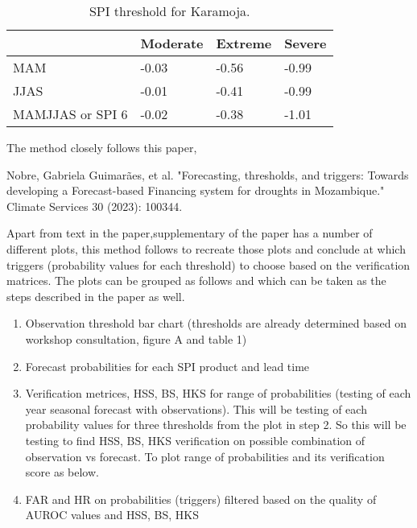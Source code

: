 \begin{table}[!ht]
	\centering
	\caption[SPI threshold for Karamoja ]{SPI threshold for Karamoja.}
	\label{tab:incpacks}
	\begin{tabular}{p{}p{}p{}p{}}
		\toprule
		&\textbf{Moderate} &\textbf{Extreme} &\textbf{Severe}\\
		\midrule
	MAM &-0.03 &-0.56 &-0.99 \\
	JJAS &-0.01 &-0.41 &-0.99 \\
	MAMJJAS or SPI 6 &-0.02 & -0.38 &-1.01 \\
		\bottomrule
	\end{tabular}
\end{table}




The method closely follows this paper,

Nobre, Gabriela Guimarães, et al. "Forecasting, thresholds, and triggers: Towards developing a Forecast-based Financing system for droughts in Mozambique." Climate Services 30 (2023): 100344. 

Apart from text in the paper,supplementary of the paper has a number of different plots, this method follows to recreate those plots and conclude at which triggers (probability values for each threshold) to choose based on the verification matrices. The plots can be grouped as follows and which can be taken as the steps described in the paper as well.  

\begin{enumerate}
	\item Observation threshold bar chart (thresholds are already determined based on workshop consultation, figure A and table 1) 
	\item Forecast probabilities for each SPI product and lead time 
	\item Verification metrices, HSS, BS, HKS for range of probabilities (testing of each year seasonal forecast with observations). This will be testing of each probability values for three thresholds from the plot in step 2. So this will be testing to find HSS, BS, HKS verification on possible combination of observation vs forecast. To plot range of probabilities and its verification score as below.
	\item FAR and HR on probabilities (triggers) filtered based on the quality of AUROC values and HSS, BS, HKS 
\end{enumerate}



